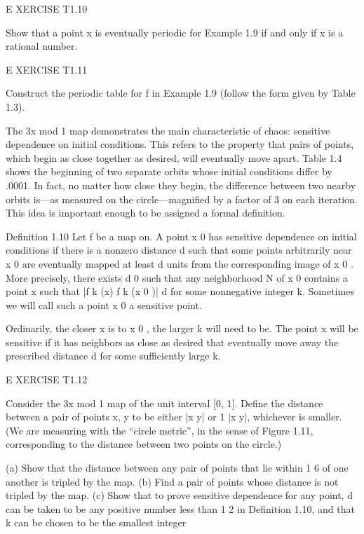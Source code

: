 \documentclass[12pt]{article}
\begin{document}
E XERCISE T1.10

Show that a point x is eventually periodic for Example 1.9 if and only if x is a rational number.

 

E XERCISE T1.11

Construct the periodic table for f in Example 1.9 (follow the form given by Table 1.3).

The 3x mod 1 map demonstrates the main characteristic of chaos: sensitive dependence on initial 
conditions. This refers to the property that pairs of points, which begin as close together as desired, 
will eventually move apart. Table 1.4 shows the beginning of two separate orbits whose initial conditions 
differ by .0001. In fact, no matter how close they begin, the difference between two nearby orbits is—as 
measured on the circle—magnified by a factor of 3 on each iteration. This idea is important enough to be 
assigned a formal definition.

Definition 1.10 Let f be a map on. A point x 0 has sensitive dependence on initial conditions if there is a 
nonzero distance d such that some points arbitrarily near x 0 are eventually mapped at least d units from 
the corresponding image of x 0 . More precisely, there exists d   0 such that any neighborhood N of x 0 
contains a point x such that |f k (x)  f k (x 0 )| 
 d for some nonnegative integer k. Sometimes we will call such a point x 0 a sensitive point.

Ordinarily, the closer x is to x 0 , the larger k will need to be. The point x will be sensitive if it has 
neighbors as close as desired that eventually move away the prescribed distance d for some sufficiently 
large k.

 

E XERCISE T1.12

Consider the 3x mod 1 map of the unit interval [0, 1]. Define the distance between a pair of points x, y to 
be either |x  y| or 1  |x  y|, whichever is smaller. (We are measuring with the “circle metric”, in the 
sense of Figure 1.11, corresponding to the distance between two points on the circle.)

(a) Show that the distance between any pair of points that lie within 1  6 of one another is tripled by the 
map. (b) Find a pair of points whose distance is not tripled by the map. (c) Show that to prove sensitive 
dependence for any point, d can be taken to be any positive number less than 1  2 in Definition 1.10, and 
that k can be chosen to be the smallest integer
\end{document}
